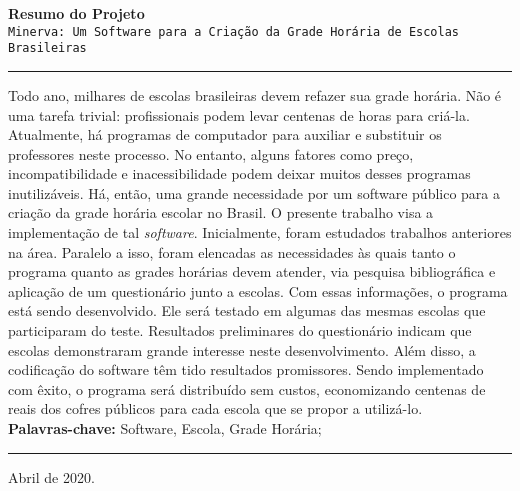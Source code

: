\documentclass[12pt,a4paper]{article}
\newcommand{\hlc}[2][yellow]{{%
    \colorlet{foo}{#1}%
    \sethlcolor{foo}\hl{#2}}%
}
\begin{document}
	\begin{center}
		\large\textbf{Resumo do Projeto} \\
		\vspace{0.2cm}
		\footnotesize\texttt{Minerva: Um Software para a Criação da Grade Horária de Escolas Brasileiras} \\
		\hrule
		\vspace{0.3cm}
	\end{center}

	Todo ano, milhares de escolas brasileiras devem refazer sua grade horária. Não é uma tarefa trivial: profissionais podem levar centenas de horas para criá-la. A\-tual\-mente, há programas de computador para auxiliar e substituir os professores neste processo. No entanto, alguns fatores como preço, incompatibilidade e inacessibilidade podem deixar muitos desses programas inutilizáveis. Há, então, uma grande necessidade por um software público para a criação da grade horária escolar no Brasil. O presente trabalho visa a implementação de tal \textit{software}. Inicialmente, foram estudados trabalhos anteriores na área. Paralelo a isso, foram elencadas as necessidades às quais tanto o programa quanto as grades horárias devem atender, via pesquisa bibliográfica e aplicação de um questionário junto a escolas. Com essas informações, o programa está sendo desenvolvido. Ele será testado em algumas das mesmas escolas que participaram do teste. Resultados preliminares do questionário indicam que escolas demonstraram grande interesse neste desenvolvimento. Além disso, a codificação do software têm tido resultados promissores. Sendo implementado com êxito, o programa será distribuído sem custos, economizando centenas de reais dos cofres públicos para cada escola que se propor a utilizá-lo.\\


	\textbf{Palavras-chave:} Software, Escola, Grade Horária;



	\vspace{0.1cm}
	\hrule
	\vspace{0.2cm}

	\footnotesize{Abril de 2020.}
\end{document}
